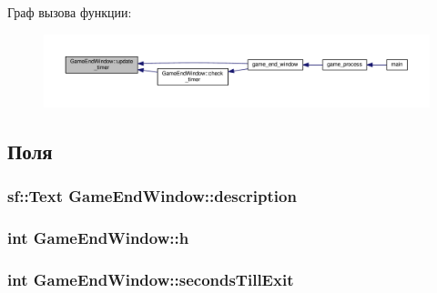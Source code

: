 Граф вызова функции\+:\nopagebreak
\begin{figure}[H]
\begin{center}
\leavevmode
\includegraphics[width=350pt]{classGameEndWindow_a91d7d99ae0dac923a1bf764f7b5d996f_icgraph}
\end{center}
\end{figure}




\subsection{Поля}
\subsubsection[{\texorpdfstring{description}{description}}]{\setlength{\rightskip}{0pt plus 5cm}sf\+::\+Text Game\+End\+Window\+::description}\hypertarget{classGameEndWindow_ab29a8ae98c80ff3facba1c9f58f57ed1}{}\label{classGameEndWindow_ab29a8ae98c80ff3facba1c9f58f57ed1}
\subsubsection[{\texorpdfstring{h}{h}}]{\setlength{\rightskip}{0pt plus 5cm}int Game\+End\+Window\+::h}\hypertarget{classGameEndWindow_adf2232ddacea4f327e8b1315633f4e4b}{}\label{classGameEndWindow_adf2232ddacea4f327e8b1315633f4e4b}
\subsubsection[{\texorpdfstring{seconds\+Till\+Exit}{secondsTillExit}}]{\setlength{\rightskip}{0pt plus 5cm}int Game\+End\+Window\+::seconds\+Till\+Exit}\hypertarget{classGameEndWindow_a7705716c485ae134468ec5cc3e92812d}{}\label{classGameEndWindow_a7705716c485ae134468ec5cc3e92812d}
